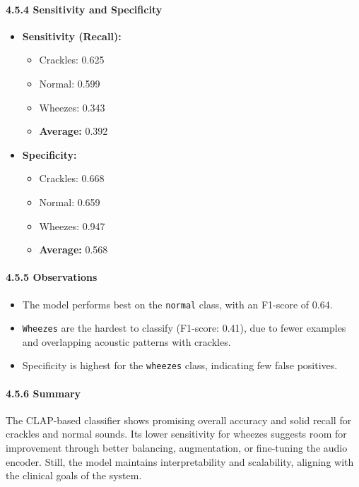\paragraph{4.5.4 Sensitivity and Specificity\\}
\begin{itemize}
    \item \textbf{Sensitivity (Recall):}
    \begin{itemize}
        \item Crackles: 0.625
        \item Normal: 0.599
        \item Wheezes: 0.343
        \item \textbf{Average:} 0.392
    \end{itemize}
    
    \item \textbf{Specificity:}
    \begin{itemize}
        \item Crackles: 0.668
        \item Normal: 0.659
        \item Wheezes: 0.947
        \item \textbf{Average:} 0.568
    \end{itemize}
\end{itemize}

\paragraph{4.5.5 Observations\\}
\begin{itemize}
    \item The model performs best on the \texttt{normal} class, with an F1-score of 0.64.
    \item \texttt{Wheezes} are the hardest to classify (F1-score: 0.41), due to fewer examples and overlapping acoustic patterns with crackles.
    \item Specificity is highest for the \texttt{wheezes} class, indicating few false positives.
\end{itemize}

\paragraph{4.5.6 Summary\\}
The CLAP-based classifier shows promising overall accuracy and solid recall for crackles and normal sounds. Its lower sensitivity for wheezes suggests room for improvement through better balancing, augmentation, or fine-tuning the audio encoder. Still, the model maintains interpretability and scalability, aligning with the clinical goals of the system.
